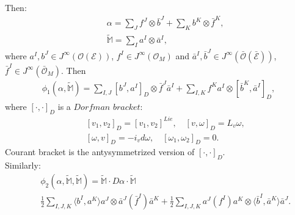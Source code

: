 \documentclass[9pt]{beamer}
\def\cE{\mathcal{E}}
\def\bcE{\bar{\mathcal{E}}}
\begin{document}
\begin{frame}[t]

Then:
\begin{eqnarray*}
&&\alpha=\sum_Jf^J\otimes {\bar{b}}^J+\sum_Kb^K\otimes {\bar{f}}^K,\nonumber\\ 
&&\tilde{\mathbb{M}}=\sum_I a^I\otimes \bar{a}^I, 
\end{eqnarray*}
where $a^I, b^J\in J^{\infty}({\mathcal{O}}(\cE))$, $f^I\in 
J^{\infty}(\mathcal{O}_M)$ and ${\bar{a}}^I, {\bar{b}}^J\in J^{\infty}({\bar{\mathcal{O}}}(\bcE))$, 
${\bar{f}}^I\in 
J^{\infty}(\bar{\mathcal{O}}_M)$. Then 
\begin{eqnarray*}
\phi_1(\alpha,\tilde{\mathbb{M}})=
\sum_{I,J}[b^J, a^I]_D\otimes 
{\bar{f}}^{J}{\bar{a}}^I+\sum_{I,K}f^Ka^I\otimes[{\bar{b}}^K, {\bar{a}}^I]_D,
\end{eqnarray*}
where $[\cdot, \cdot]_D$ is a $Dorfman$ $bracket$:
\begin{eqnarray*}
&&[v_1,v_2]_D=[v_1,v_2]^{Lie}, \quad [v,\omega]_D=L_v\omega,\nonumber\\
&&[\omega , v]_D=-i_vd\omega,\quad [\omega_1,\omega_2]_D=0.
\end{eqnarray*}
Courant bracket is the antysymmetrized version of $[\cdot,\cdot]_D$.\\


Similarly:
\begin{eqnarray*}
&&\phi_2(\alpha, \tilde{\mathbb{M}},\tilde{\mathbb{M}})=\tilde{\mathbb{M}}\cdot D\alpha\cdot \tilde{\mathbb{M}}
\nonumber\\
&&\frac{1}{2}\sum_{I,J,K}\langle b^I, a^K\rangle a^J\otimes \bar{a}^J(\bar{f}^I) {\bar{a}}^K+\frac{1}{2}\sum_{I,J,K}
 a^J(f^I) {a}^K\otimes \langle {\bar{b}}^I, {\bar{a}}^K\rangle {\bar{a}}^J.
\end{eqnarray*}


\end{frame}
\end{document}
